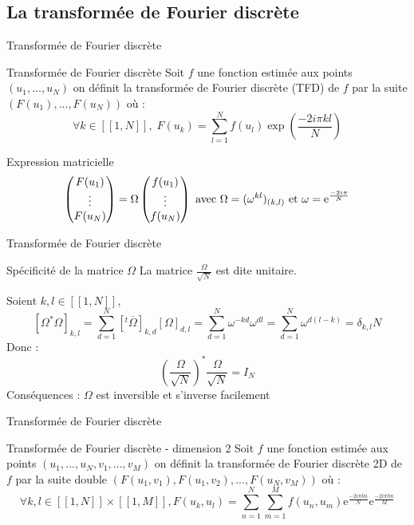\documentclass{beamer}
\newcommand*{\iintervalle}[2]{[\![#1,#2]\!]}
\begin{document}
\subsection{La transformée de Fourier discrète}
\begin{frame}{Transformée de Fourier discrète}
    \begin{beamerboxesrounded}{Transformée de Fourier discrète}
        Soit $f$ une fonction estimée aux points $(u_1, ... , u_N)$ on définit la transformée de Fourier discrète (TFD) de $f$ par la suite $(F(u_1), ... , F(u_N))$
        où : $$\forall k \in \iintervalle{1}{N}, \; F(u_k) = \sum_{l = 1}^N f(u_l)\exp\left(\frac{-2i\pi k l}{N}\right)$$
    \end{beamerboxesrounded}
    \begin{beamerboxesrounded}{Expression matricielle}
        $$\begin{pmatrix}
            F(u_1) \\
            \vdots \\
            F(u_N)
        \end{pmatrix} =
            \Omega
          \begin{pmatrix}
             f(u_1) \\ \vdots \\ f(u_N)
         \end{pmatrix}\\
         \text{ avec } \Omega = (\omega^{kl})_{(k,l)} \text{ et } \omega = \mathrm{e}^{\frac{-2i\pi}{N}}$$
    \end{beamerboxesrounded}
\end{frame}
\begin{frame}{Transformée de Fourier discrète}
    \begin{beamerboxesrounded}{Spécificité de la matrice $\Omega$}
        La matrice $\frac{\Omega}{\sqrt{N}}$ est dite unitaire. 
    \end{beamerboxesrounded}
    $ \text{Soient } k,l \in \iintervalle{1}{N}$, 
    $$[\Omega^* \Omega]_{k,l} = \sum_{d = 1}^N [^t\overline{\Omega}]_{k,d} [\Omega]_{d,l} = \sum_{d = 1}^N \omega^{-kd} \omega^{dl} = \sum_{d= 1}^N \omega^{d(l-k)} = \delta_{k,l}N$$
    Donc : $$\left(\frac{\Omega}{\sqrt{N}}\right)^* \frac{\Omega}{\sqrt{N}} = I_N$$
    Conséquences : $\Omega$ est inversible et s'inverse facilement
\end{frame}

\begin{frame}{Transformée de Fourier discrète}
    \begin{beamerboxesrounded}{Transformée de Fourier discrète - dimension 2}
        Soit $f$ une fonction estimée aux points $(u_1, ... , u_N, v_1, ... , v_M)$ on définit la transformée de Fourier discrète 2D de $f$ par la suite double $(F(u_1, v_1), F(u_1, v_2), ... , F(u_N,v_M))$ où : 
        $$\forall k, l \in \iintervalle{1}{N} \times \iintervalle{1}{M}, F(u_k, u_l) = \sum_{n = 1}^N \sum_{m = 1}^M f(u_n,u_m) \mathrm{e}^{\frac{-2i \pi k n}{N}} \mathrm{e}^{\frac{-2i \pi l m}{M}} $$
    \end{beamerboxesrounded}
\end{frame}
\end{document}
